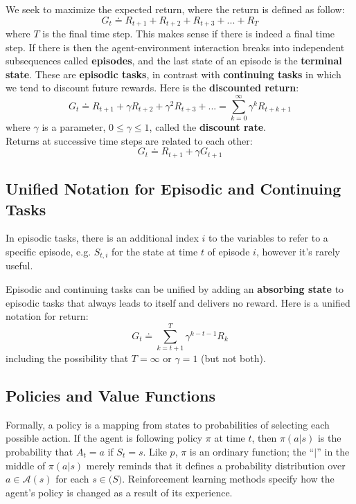 \documentclass[11pt]{article}
\begin{document}
We seek to maximize the expected return, where the return is defined as follow:
\begin{equation}
G_{t} \doteq R_{t+1}+R_{t+2}+R_{t+3}+{...}+R_{T}
\end{equation}
where \(T\) is the final time step. This makes sense if there is indeed a final
time step. If there is then the agent-environment interaction breaks into
independent subsequences called \textbf{episodes}, and the last state of an episode is
the \textbf{terminal state}. These are \textbf{episodic tasks}, in contrast with \textbf{continuing
tasks} in which we tend to discount future rewards. Here is the \textbf{discounted
return}:
\begin{equation}
G_{t} \doteq R_{t+1} + \gamma R_{t+2} + \gamma^{2} R_{t+3}+{...} = \sum\limits_{k=0}^{\infty} \gamma^{k} R_{t+k+1}
\end{equation}
where \(\gamma\) is a parameter, \(0 \leq \gamma \leq 1\), called the \textbf{discount rate}.\\
Returns at successive time steps are related to each other:
\begin{equation}
G_{t} \doteq R_{t+1} + \gamma G_{t+1}
\end{equation}

\subsection{Unified Notation for Episodic and Continuing Tasks}
\label{sec:org8d41c43}

In episodic tasks, there is an additional index \(i\) to the variables to refer to
a specific episode, e.g. \(S_{t,i}\) for the state at time \(t\) of episode \(i\),
however it's rarely useful.

Episodic and continuing tasks can be unified by adding an \textbf{absorbing state} to
episodic tasks that always leads to itself and delivers no reward. Here is a
unified notation for return:
\begin{equation}
G_{t} \doteq \sum\limits_{k=t+1}^{T} \gamma^{k-t-1} R_{k}
\end{equation}
including the possibility that \(T=\infty\) or \(\gamma = 1\) (but not both).

\subsection{Policies and Value Functions}
\label{sec:org81ebaa9}

Formally, a policy is a mapping from states to probabilities of selecting each
possible action. If the agent is following policy \(\pi\) at time \(t\), then
\(\pi(a|s)\) is the probability that \(A_{t} = a\) if \(S_{t} = s\). Like \(p\), \(\pi\)
is an ordinary function; the “\(\mid\)” in the middle of \(\pi(a | s)\) merely
reminds that it defines a probability distribution over \(a \in \mathcal{A}(s)\)
for each \(s \in \mathcal(S)\). Reinforcement learning methods specify how the
agent’s policy is changed as a result of its experience.
\end{document}
